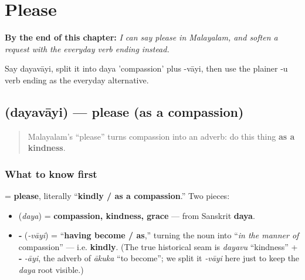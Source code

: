 
\chapter{Please}
\label{ch:ml-please}

\begin{chapteropening}
\textbf{By the end of this chapter:} \emph{I can say please in Malayalam, and soften a request with the everyday verb ending instead.}

Say dayavāyi, split it into daya 'compassion' plus -vāyi, then use the plainer -u verb ending as the everyday alternative.
\end{chapteropening}

\section[\texorpdfstring{\ml{ദയവായി} (dayavāyi)}{ദയവായി (dayavāyi)}]{ (dayavāyi) — please (as a compassion)}

\label{lesson:ML-C08-dayavayi}



\begin{quote}
Malayalam's \textquotedblleft{}please\textquotedblright{} turns compassion into an adverb: do this thing \textbf{as a kindness}.
\end{quote}

\subsection*{What to know first}
\textbf{} = \textbf{please}, literally \textquotedblleft{}\textbf{kindly / as a compassion}.\textquotedblright{} Two pieces:

\begin{itemize}
\raggedright
  \item \textbf{} (\emph{daya}) = \textbf{compassion, kindness, grace} — from Sanskrit \textbf{daya}.
  \item \textbf{‑} (\emph{-vāyi}) = \textquotedblleft{}\textbf{having become / as},\textquotedblright{} turning the noun into \textquotedblleft{}\emph{in the manner of} compassion\textquotedblright{} — i.e. \textbf{kindly}. (The true historical seam is \emph{dayavu} \textquotedblleft{}kindness\textquotedblright{} + \textbf{‑} \emph{-āyi}, the adverb of \textbf{} \emph{ākuka} \textquotedblleft{}to become\textquotedblright{}; we split it \emph{-vāyi} here just to keep the \emph{daya} root visible.)
\end{itemize}


